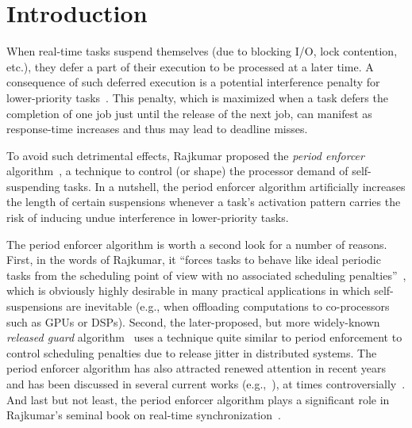 


\section{Introduction} 
When real-time tasks suspend themselves (due to blocking I/O, lock contention, etc.), they defer a part of their execution to be processed at a later time. A consequence of such deferred execution is a potential interference penalty for lower-priority tasks~\cite{LSS:87,LSST:91,Ra:90,ABRTW:93,SLS:95}. This penalty, which is maximized when a task defers the completion of one job just until the release of the next job, can manifest as response-time increases and thus may lead to deadline misses.

To avoid such detrimental effects,  Rajkumar \cite{Raj:suspension1991} proposed the \emph{period enforcer} algorithm~\cite{Raj:suspension1991},  a technique to control (or shape) the processor demand of self-suspending tasks. In a nutshell, the period enforcer algorithm artificially increases the length of certain suspensions whenever a task's activation pattern carries the risk of inducing undue interference in lower-priority tasks.

The period enforcer algorithm is worth a second look for a number of reasons. First, in the words of Rajkumar, it ``forces tasks to behave like ideal periodic tasks from the scheduling point of view with no associated scheduling penalties''~\cite{Raj:suspension1991}, which is obviously highly desirable in many practical applications in which self-suspensions are inevitable (e.g., when offloading computations to co-processors such as GPUs or DSPs). Second, the later-proposed, but more widely-known \emph{released guard} algorithm~\cite{SL:96} uses a technique quite similar to period enforcement to control scheduling penalties due to release jitter in distributed systems. The period enforcer algorithm has also attracted renewed attention in recent years and has been discussed in several current works  (e.g.,~\cite{DBLP:conf/rtss/ChenL14,LNR:09,LR:10,Lak:11,LC:14,KANR:13,HY:11,CA:09,CA:10,CA:10b}), at times controversially~\cite{BA:08a}. And last but not least, the period enforcer algorithm plays a significant role in Rajkumar's seminal book on   real-time  synchronization~\cite{Raj:91}. 

